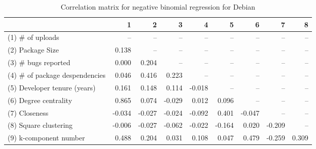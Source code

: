 \begin{table}[H]
\caption{Correlation matrix for negative binomial regression for Debian}
\label{corr_table_nbinomial}
\begin{center}
\begin{small}
\begin{tabular}{lrrrrrrrr}
\toprule
{} &      1 &      2 &      3 &      4 &      5 &      6 &      7 &     8 \\
\midrule
(1) \# of uploads               &    -- &    -- &    -- &    -- &    -- &    -- &    -- &   -- \\
(2) Package Size               &  0.138 &    -- &    -- &    -- &    -- &    -- &    -- &   -- \\
(3) \# bugs reported            &  0.000 &  0.204 &    -- &    -- &    -- &    -- &    -- &   -- \\
(4) \# of package despendencies &  0.046 &  0.416 &  0.223 &    -- &    -- &    -- &    -- &   -- \\
(5) Developer tenure (years)   &  0.161 &  0.148 &  0.114 & -0.018 &    -- &    -- &    -- &   -- \\
(6) Degree centrality          &  0.865 &  0.074 & -0.029 &  0.012 &  0.096 &    -- &    -- &   -- \\
(7) Closeness                  & -0.034 & -0.027 & -0.024 & -0.092 &  0.401 & -0.047 &    -- &   -- \\
(8) Square clustering          & -0.006 & -0.027 & -0.062 & -0.022 & -0.164 &  0.020 & -0.209 &   -- \\
(9) k-component number         &  0.488 &  0.204 &  0.031 &  0.108 &  0.047 &  0.479 & -0.259 & 0.309 \\
\bottomrule
\end{tabular}
\end{small} 
\end{center} 
\end{table}

